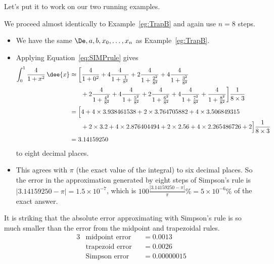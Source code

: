 Let's put it to work on our two running examples.
\begin{eg}\label{eg:SimpsonB}
\soln We proceed almost identically to Example~\ref{eg:TrapB} and again use $n=8$ steps.
\begin{itemize}
 \item We have the same $\De,a,b,x_0,\dots, x_n$ as Example~\ref{eg:TrapB}.
 \item Applying Equation~\ref{eq:SIMPrule} gives
\begin{align*}
\int_0^1 \frac{4}{1+x^2}\,\dee{x}
&\approx
\bigg[\frac{4}{1+0^2}+
             4\frac{4}{1+\tfrac{1}{8^2}}+
             2\frac{4}{1+\tfrac{2^2}{8^2}}+
             4\frac{4}{1+\tfrac{3^2}{8^2}}\\
&\hskip.25in +2\frac{4}{1+\tfrac{4^2}{8^2}}+
             4\frac{4}{1+\tfrac{5^2}{8^2}}+
             2\frac{4}{1+\tfrac{6^2}{8^2}}+
             4\frac{4}{1+\tfrac{7^2}{8^2}}+
            \frac{4}{1+\tfrac{8^2}{8^2}}\bigg]\frac{1}{8\times 3}\\
&=\Big[         4 +
        4\times 3.938461538 +
        2\times 3.764705882 +
        4\times 3.506849315 \\
&\hskip.25in +2\times 3.2 +
          4\times 2.876404494 +
         2\times 2.56 +
         4\times 2.265486726 +
            2\Big]\frac{1}{8\times 3}\\
&=3.14159250
\end{align*}
to eight decimal places.
\item This agrees with $\pi$ (the exact value of the integral) to six decimal places.
So the error in the approximation generated by eight steps  of Simpson's
rule is $|3.14159250-\pi|=1.5\times 10^{-7}$, which is
$100\tfrac{|3.14159250-\pi|}{\pi}\% =5\times 10^{-6}\%$ of the exact answer.
\end{itemize}
\end{eg}
It is striking that the absolute error approximating with Simpson's rule is so much
smaller than the error from the midpoint and trapezoidal rules.
\begin{alignat*}{3}
&\text{midpoint error} &&= 0.0013\\
&\text{trapezoid error} &&= 0.0026\\
&\text{Simpson error} &&= 0.00000015
\end{alignat*}

